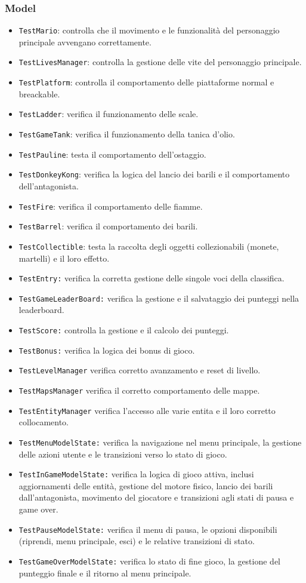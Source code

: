 \documentclass[a4paper,12pt]{report}
\begin{document}
\newpage
\subsubsection*{Model}
\begin{itemize}
	\item \texttt{TestMario}: controlla che il movimento e le funzionalità del personaggio principale avvengano correttamente.
	\item \texttt{TestLivesManager}: controlla la gestione delle vite del personaggio principale.
	\item \texttt{TestPlatform}: controlla il comportamento delle piattaforme normal e breackable.
	\item \texttt{TestLadder}: verifica il funzionamento delle scale.
	\item \texttt{TestGameTank}: verifica il funzionamento della tanica d'olio.
	\item \texttt{TestPauline}: testa il comportamento dell'ostaggio.
	\item \texttt{TestDonkeyKong}: verifica la logica del lancio dei barili e il comportamento dell'antagonista.
	\item \texttt{TestFire}: verifica il comportamento delle fiamme.
	\item \texttt{TestBarrel}: verifica il comportamento dei barili.
	\item \texttt{TestCollectible}: testa la raccolta degli oggetti collezionabili (monete, martelli) e il loro effetto.
	\item \texttt{TestEntry:} verifica la corretta gestione delle singole voci della classifica.
	\item \texttt{TestGameLeaderBoard:} verifica la gestione e il salvataggio dei punteggi nella leaderboard.
	\item \texttt{TestScore:} controlla la gestione e il calcolo dei punteggi.
	\item \texttt{TestBonus:} verifica la logica dei bonus di gioco.
	\item \texttt{TestLevelManager} verifica corretto avanzamento e reset di livello.
	\item \texttt{TestMapsManager} verifica il corretto comportamento delle mappe.
	\item \texttt{TestEntityManager} verifica l'accesso alle varie entita e il loro corretto collocamento.
	\item \texttt{TestMenuModelState:} verifica la navigazione nel menu principale, la gestione delle azioni utente e le transizioni verso lo stato di gioco.
	\item \texttt{TestInGameModelState:} verifica la logica di gioco attiva, inclusi aggiornamenti delle entità, gestione del motore fisico, lancio dei barili
	      dall'antagonista, movimento del giocatore e transizioni agli stati di pausa e game over.
	\item \texttt{TestPauseModelState:} verifica il menu di pausa, le opzioni disponibili (riprendi, menu principale, esci) e le relative transizioni di stato.
	\item \texttt{TestGameOverModelState:} verifica lo stato di fine gioco, la gestione del punteggio finale e il ritorno al menu principale.
\end{itemize}
\end{document}
